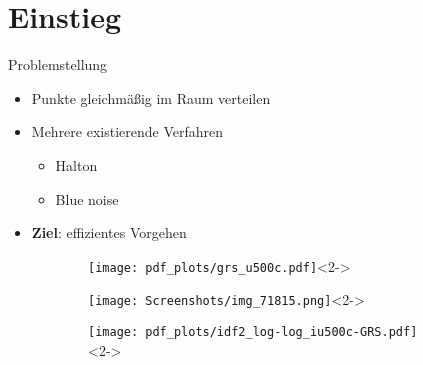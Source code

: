 \section{Einstieg}

\begin{frame}{Problemstellung}
	\begin{itemize}
		\item Punkte gleichmäßig im Raum verteilen
		\item<3-> Mehrere existierende Verfahren
		\begin{itemize}
			\item<4-> Halton
			\item<4-> Blue noise
		\end{itemize}
		\item<5-> \textbf{Ziel}: effizientes Vorgehen 
	\end{itemize}
	\begin{figure}
		\begin{subfigure}{.3\textwidth}
			\centering
			\texttt{[image: pdf\_plots/grs\_u500c.pdf]}<2->
		\end{subfigure}
		\hfill
		\begin{subfigure}{.3\textwidth}
			\centering
			\texttt{[image: Screenshots/img\_71815.png]}<2->
		\end{subfigure}
		\begin{subfigure}{.3\textwidth}
			\centering
			\texttt{[image: pdf\_plots/idf2\_log-log\_iu500c-GRS.pdf]}<2->
		\end{subfigure}
	\end{figure}
\end{frame}